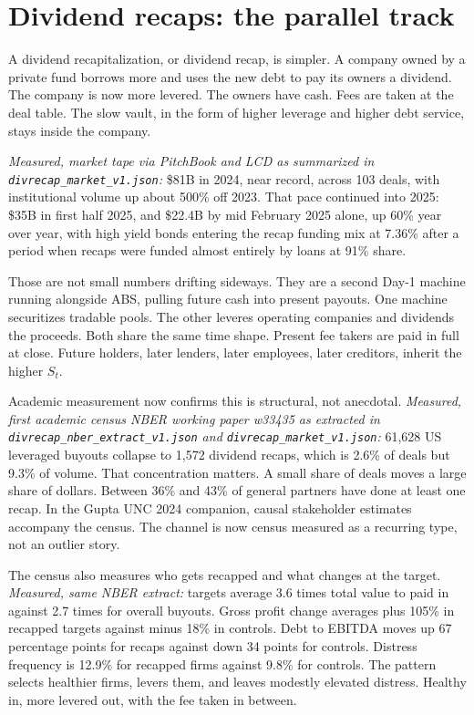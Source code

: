 \section{Dividend recaps: the parallel track}

A dividend recapitalization, or dividend recap, is simpler. A company owned by a private fund borrows more and uses the new debt to pay its owners a dividend. The company is now more levered. The owners have cash. Fees are taken at the deal table. The slow vault, in the form of higher leverage and higher debt service, stays inside the company.

\textit{Measured, market tape via PitchBook and LCD as summarized in \texttt{divrecap\_market\_v1.json}:} \$81B in 2024, near record, across 103 deals, with institutional volume up about 500\% off 2023. That pace continued into 2025: \$35B in first half 2025, and \$22.4B by mid February 2025 alone, up 60\% year over year, with high yield bonds entering the recap funding mix at 7.36\% after a period when recaps were funded almost entirely by loans at 91\% share.

Those are not small numbers drifting sideways. They are a second Day-1 machine running alongside ABS, pulling future cash into present payouts. One machine securitizes tradable pools. The other leveres operating companies and dividends the proceeds. Both share the same time shape. Present fee takers are paid in full at close. Future holders, later lenders, later employees, later creditors, inherit the higher $S_t$.

Academic measurement now confirms this is structural, not anecdotal. \textit{Measured, first academic census NBER working paper w33435 as extracted in \texttt{divrecap\_nber\_extract\_v1.json} and \texttt{divrecap\_market\_v1.json}:} 61,628 US leveraged buyouts collapse to 1,572 dividend recaps, which is 2.6\% of deals but 9.3\% of volume. That concentration matters. A small share of deals moves a large share of dollars. Between 36\% and 43\% of general partners have done at least one recap. In the Gupta UNC 2024 companion, causal stakeholder estimates accompany the census. The channel is now census measured as a recurring type, not an outlier story.

The census also measures who gets recapped and what changes at the target. \textit{Measured, same NBER extract:} targets average 3.6 times total value to paid in against 2.7 times for overall buyouts. Gross profit change averages plus 105\% in recapped targets against minus 18\% in controls. Debt to EBITDA moves up 67 percentage points for recaps against down 34 points for controls. Distress frequency is 12.9\% for recapped firms against 9.8\% for controls. The pattern selects healthier firms, levers them, and leaves modestly elevated distress. Healthy in, more levered out, with the fee taken in between.

